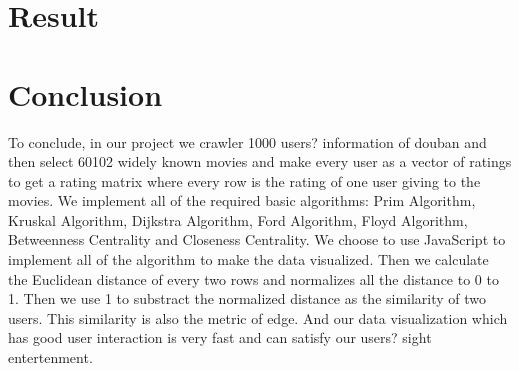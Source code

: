 \documentclass{article}
\begin{document}
\section{Result}
  
\section{Conclusion}
To conclude, in our project we crawler 1000 users? information of douban and then select 60102 widely known movies and make every user as a vector of ratings to get a rating matrix where every row is the rating of one user giving to the movies. We implement all of the required basic algorithms: Prim Algorithm, Kruskal Algorithm, Dijkstra Algorithm, Ford Algorithm, Floyd Algorithm, Betweenness Centrality and Closeness Centrality. We choose to use JavaScript to implement all of the algorithm to make the data visualized. Then we calculate the Euclidean distance of every two rows and normalizes all the distance to 0 to 1. Then we use 1 to substract the normalized distance as the similarity of two users. This similarity is also the metric of edge.
And our data visualization which has good user interaction is very fast and can satisfy our users? sight entertenment.

\begin{small}

 
\end{small}

\medskip
\end{document}
